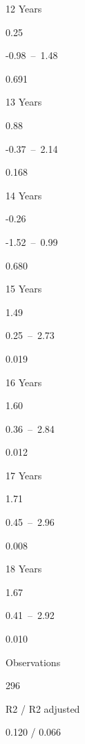 \documentclass[
]{article}
\begin{document}
12 Years

0.25

-0.98~--~1.48

0.691

13 Years

0.88

-0.37~--~2.14

0.168

14 Years

-0.26

-1.52~--~0.99

0.680

15 Years

1.49

0.25~--~2.73

0.019

16 Years

1.60

0.36~--~2.84

0.012

17 Years

1.71

0.45~--~2.96

0.008

18 Years

1.67

0.41~--~2.92

0.010

Observations

296

R2 / R2 adjusted

0.120 / 0.066
\end{document}
